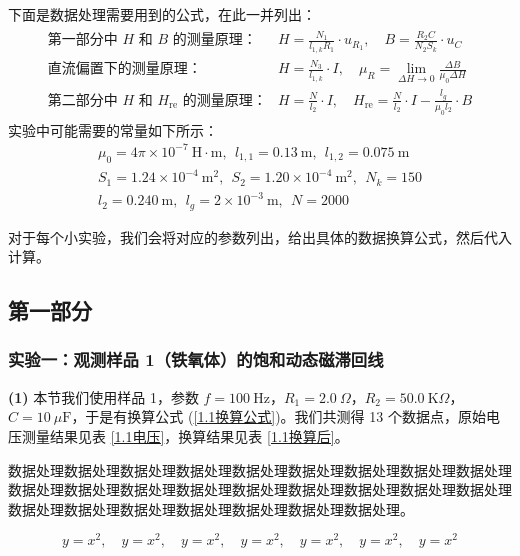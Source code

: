 \documentclass[UTF8]{article}
\def\kO{\ \mathrm{K}\Omega}
\def\uF{\ \mu\mathrm{F}}
\theoremstyle{MyLineTheoremStyle} %
\theoremstyle{MyBlockTheoremStyle} %
\theoremstyle{MySubsubsectionStyle} %
\begin{document}
下面是数据处理需要用到的公式，在此一并列出：
\begin{align}
\boxed{
\begin{aligned}
    \text{第一部分中 $H$ 和 $B$ 的测量原理：}& H = \frac{N_1}{l_{1, k}R_1}\cdot u_{R_1},\quad B = \frac{R_2 C}{N_2 S_k}\cdot u_C
    \\
    \text{直流偏置下的测量原理：}&  H = \frac{N_3}{l_{1, k}}\cdot I,\quad \mu_R=\lim_{\Delta H\to 0}\frac{\Delta B}{\mu_0\Delta H}
    \\
    \text{第二部分中 $H$ 和 $H_{\text{re}}$ 的测量原理：}& H = \frac{N}{l_2}\cdot I,\quad H_{\text{re}} = \frac{N}{l_2}\cdot I - \frac{l_g}{\mu_0 l_2}\cdot B
\end{aligned}
}
\end{align}
实验中可能需要的常量如下所示：
\begin{gather}
    \mu_0 = 4\pi \times 10^{-7}\  \mathrm{H\cdot m},\ \ 
    l_{1, 1} = 0.13 \ \mathrm{m},\ \ 
    l_{1, 2} = 0.075 \ \mathrm{m}
    \\
    S_1 = 1.24 \times 10^{-4}\ \mathrm{m^2} ,\ \ 
    S_2 = 1.20 \times 10^{-4}\ \mathrm{m^2} ,\ \ 
    N_k = 150
    \\ 
    l_2 = 0.240 \ \mathrm{m},\ \ l_g = 2 \times 10^{-3} \ \mathrm{m},\ \ N = 2000
\end{gather}

对于每个小实验，我们会将对应的参数列出，给出具体的数据换算公式，然后代入计算。

\subsection{第一部分}
\subsubsection{实验一：观测样品 1（铁氧体）的饱和动态磁滞回线}\label{铁氧体}

\noindent \textbf{(1)} 本节我们使用样品 1，参数 $f = 100 \ \mathrm{Hz}$，$R_1 = 2.0 \ \Omega$，$R_2 = 50.0 \kO$，$C = 10 \uF$，于是有换算公式 (\ref{1.1换算公式})。我们共测得 13 个数据点，原始电压测量结果见表 \ref{1.1电压}，换算结果见表 \ref{1.1换算后}。

数据处理数据处理数据处理数据处理数据处理数据处理数据处理数据处理数据处理数据处理数据处理数据处理数据处理数据处理数据处理数据处理数据处理数据处理数据处理数据处理数据处理数据处理数据处理数据处理数据处理。


\begin{equation}\label{1.1换算公式}
    y = x^2,\quad y = x^2,\quad y = x^2,\quad y = x^2,\quad y = x^2,\quad y = x^2,\quad y = x^2
\end{equation}
\end{document}

